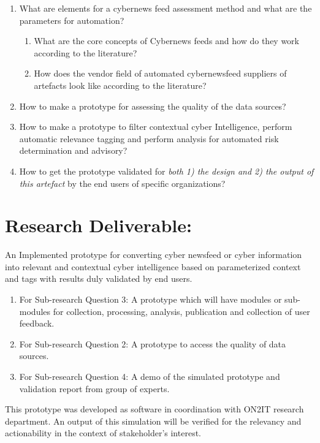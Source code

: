 \begin{enumerate}
    \item What are elements for a cybernews feed assessment method and what are the parameters for automation?
    \begin{enumerate}
        \item What are the core concepts of Cybernews feeds and how do they work according to the literature?
        
        \item How does the vendor field of automated cybernewsfeed suppliers of artefacts look like according to the literature?
    \end{enumerate}
    
    \item How to make a prototype for assessing the quality of the data sources?

    \item How to make a prototype to filter contextual cyber Intelligence, perform automatic relevance tagging and perform analysis for automated risk determination and advisory?
    
    \item How to get the prototype validated for \emph{both 1) the design and 2) the output of this artefact} by the end users of specific organizations?
\end{enumerate}


\section{Research Deliverable:}
An Implemented prototype for converting cyber newsfeed or cyber information into relevant and contextual cyber intelligence based on parameterized context and tags with results duly validated by end users.
\begin{enumerate}
    \item For Sub-research Question 3: A prototype which will have modules or sub-modules for collection, processing, analysis, publication and collection of user feedback.
    \item For Sub-research Question 2: A prototype to access the quality of data sources.
    \item For Sub-research Question 4: A demo of the simulated prototype and validation report from group of experts.
\end{enumerate}

This prototype was developed as software in coordination with ON2IT research department. An output of this simulation will be verified for the relevancy and actionability in the context of stakeholder’s interest.


